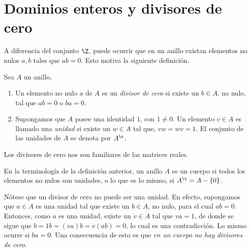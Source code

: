 \section{Dominios enteros y divisores de cero}
A diferencia del conjunto $\Z$, puede ocurrir que en un anillo existan elementos no nulos $a,b$ tales que $ab=0$. Esto motiva la siguiente definición. 
\begin{defi} 
	Sea $A$ un anillo, 
	\begin{enumerate}
		\item Un elemento no nulo $a$ de $A$ es un \textit{divisor de cero} si existe un $b \in A$, no nulo, tal que $ab = 0$ o $ba = 0$.
		\item Supongamos que $A$ posee una identidad $1$, con $1 \neq 0$. Un elemento $v \in A$ es llamado una \textit{unidad} si existe un $w \in A$ tal que, $vw = wv = 1$. El conjunto de las unidades de $A$ se denota por $A^{\t}$.
	\end{enumerate}
\end{defi}
\begin{nota}
	Los divisores de cero nos son familiares de las matrices reales.
\end{nota}
En la terminología de la definición anterior, un anillo $A$ es un cuerpo si todos los elementos no nulos son unidades, o lo que es lo mismo, si $A^{\t}=  A - \{0\}$. 

Nótese que un divisor de cero no puede ser una unidad. En efecto, supongamos que $a \in A$ es una unidad tal que existe un $b \in A$, no nulo, para el cual $ab = 0$. Entonces, como $a$ es una unidad, existe un $v \in A$ tal que $va = 1$, de donde se sigue que $b = 1b = (va)b = v(ab) = 0$, lo cual es una contradicción. Lo mismo ocurre si $ba = 0$. Una consecuencia de esto es que \textit{en un cuerpo no hay divisores de cero.}

